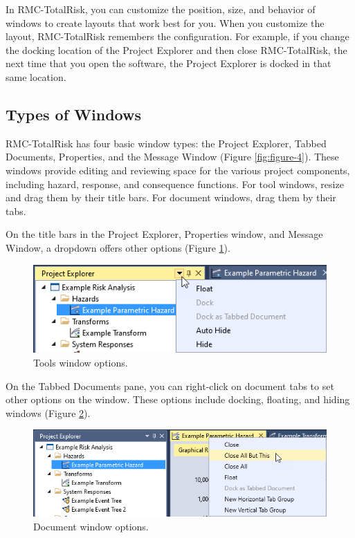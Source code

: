 \documentclass[
]{book}
\begin{document}
In RMC-TotalRisk, you can customize the position, size, and behavior of windows to create layouts that work best for you. When you customize the layout, RMC-TotalRisk remembers the configuration. For example, if you change the docking location of the Project Explorer and then close RMC-TotalRisk, the next time that you open the software, the Project Explorer is docked in that same location.

\hypertarget{types-of-windows}{%
\subsection{Types of Windows}\label{types-of-windows}}

RMC-TotalRisk has four basic window types: the Project Explorer, Tabbed Documents, Properties, and the Message Window (Figure \ref{fig:figure-4}). These windows provide editing and reviewing space for the various project components, including hazard, response, and consequence functions. For tool windows, resize and drag them by their title bars. For document windows, drag them by their tabs.

On the title bars in the Project Explorer, Properties window, and Message Window, a dropdown offers other options (Figure \ref{fig:figure-18}).

\begin{figure}

{\centering \includegraphics{images/figure18} 

}

\caption{Tools window options.}\label{fig:figure-18}
\end{figure}

On the Tabbed Documents pane, you can right-click on document tabs to set other options on the window. These options include docking, floating, and hiding windows (Figure \ref{fig:figure-19}).

\begin{figure}

{\centering \includegraphics{images/figure19} 

}

\caption{Document window options.}\label{fig:figure-19}
\end{figure}
\end{document}
